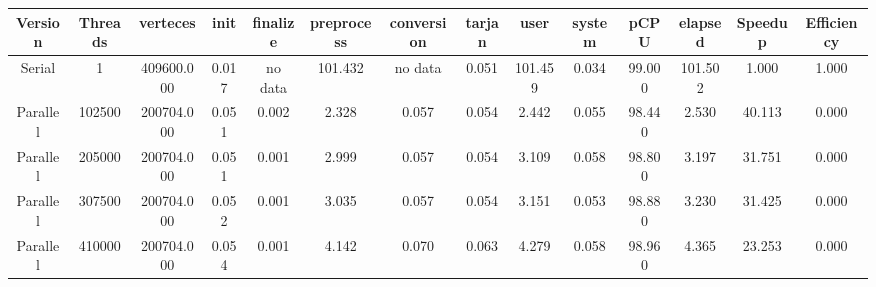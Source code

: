 \begin{tabular}{|c|c|c|c|c|c|c|c|c|c|c|c|c|c|}
\toprule
 Version &  Threads &   verteces &  init & finalize &  preprocess & conversion &  tarjan &    user &  system &   pCPU &  elapsed &  Speedup &  Efficiency \\
\midrule
  Serial &        1 & 409600.000 & 0.017 &  no data &     101.432 &    no data &   0.051 & 101.459 &   0.034 & 99.000 &  101.502 &    1.000 &       1.000 \\
Parallel &   102500 & 200704.000 & 0.051 &    0.002 &       2.328 &      0.057 &   0.054 &   2.442 &   0.055 & 98.440 &    2.530 &   40.113 &       0.000 \\
Parallel &   205000 & 200704.000 & 0.051 &    0.001 &       2.999 &      0.057 &   0.054 &   3.109 &   0.058 & 98.800 &    3.197 &   31.751 &       0.000 \\
Parallel &   307500 & 200704.000 & 0.052 &    0.001 &       3.035 &      0.057 &   0.054 &   3.151 &   0.053 & 98.880 &    3.230 &   31.425 &       0.000 \\
Parallel &   410000 & 200704.000 & 0.054 &    0.001 &       4.142 &      0.070 &   0.063 &   4.279 &   0.058 & 98.960 &    4.365 &   23.253 &       0.000 \\
\bottomrule
\end{tabular}
